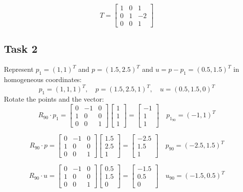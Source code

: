 \documentclass[tikz,14pt,fleqn]{article}
\begin{document}
\[
T =
\begin{bmatrix}
1 & 0 & 1\\
0 & 1 & -2\\
0 & 0 & 1
\end{bmatrix}
\]


\subsection{Task 2}
Represent $p_1 = (1, 1)^T$ and $p = (1.5, 2.5)^T$ and $u = p - p_1 = (0.5, 1.5)^T$ in homogeneous coordinates:
\[
p_1 = (1,1,1)^T, \quad p = (1.5,2.5,1)^T, \quad u = (0.5,1.5,0)^T
\]
Rotate the points and the vector:
\[
R_{90} \cdot p_1=
\begin{bmatrix}
0 & -1 & 0\\
1 & 0 & 0\\
0 & 0 & 1
\end{bmatrix}
\begin{bmatrix}
1\\
1\\
1
\end{bmatrix}=
\begin{bmatrix}
-1\\
1\\
1
\end{bmatrix}
\quad p_{1_{90}} = (-1,1)^T
\]

\[
R_{90} \cdot p=
\begin{bmatrix}
0 & -1 & 0\\
1 & 0 & 0\\
0 & 0 & 1
\end{bmatrix}
\begin{bmatrix}
1.5\\
2.5\\
1
\end{bmatrix}=
\begin{bmatrix}
-2.5\\
1.5\\
1
\end{bmatrix}
\quad p_{90} = (-2.5, 1.5)^T
\]

\[
R_{90} \cdot u=
\begin{bmatrix}
0 & -1 & 0\\
1 & 0 & 0\\
0 & 0 & 1
\end{bmatrix}
\begin{bmatrix}
0.5\\
1.5\\
0
\end{bmatrix}=
\begin{bmatrix}
-1.5\\
0.5\\
0
\end{bmatrix}
\quad u_{90} = (-1.5, 0.5)^T
\]
\end{document}
